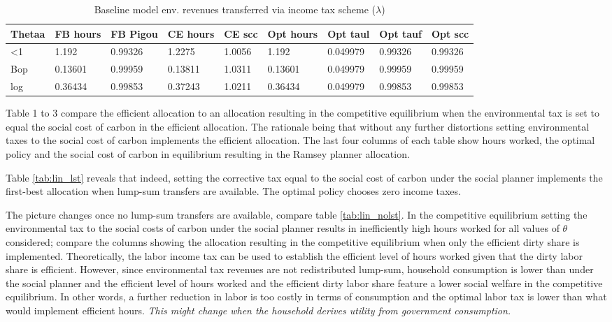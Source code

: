 \begin{table}[h!!]
	\caption{Baseline model env. revenues transferred via income tax scheme ($\lambda$)}\label{tab:base}
	\begin{tabular}{lllllllll}
		Thetaa & FB hours & FB Pigou & CE hours & CE scc & Opt hours & Opt taul & Opt tauf & Opt scc \\ 
		\hline 
		<1 & 1.192 & 0.99326 & 1.2275 & 1.0056 & 1.192 & 0.049979 & 0.99326 & 0.99326 \\ 
		Bop & 0.13601 & 0.99959 & 0.13811 & 1.0311 & 0.13601 & 0.049979 & 0.99959 & 0.99959 \\ 
		log & 0.36434 & 0.99853 & 0.37243 & 1.0211 & 0.36434 & 0.049979 & 0.99853 & 0.99853 \\ 
		\hline 
	\end{tabular}
\end{table}



Table 1 to 3 compare the efficient allocation to an allocation resulting in the competitive equilibrium when the environmental tax is set to equal the social cost of carbon in the efficient allocation. The rationale being that without any further distortions setting environmental taxes to the social cost of carbon implements the efficient allocation. The last four columns of each table show hours worked, the optimal policy and the social cost of carbon in equilibrium resulting in the Ramsey planner allocation. 

Table \ref{tab:lin_lst} reveals that indeed, setting the corrective tax equal to the social cost of carbon under the social planner implements the first-best allocation when lump-sum transfers are available. The optimal policy chooses zero income taxes. 

The picture changes once no lump-sum transfers are available, compare table \ref{tab:lin_nolst}. In the competitive equilibrium setting the environmental tax to the social costs of carbon under the social planner results in inefficiently high hours worked for all values of $\theta$ considered; compare the columns showing the allocation resulting in the competitive equilibrium when only the efficient dirty share is implemented. 
Theoretically, the labor income tax can be used to establish the 
efficient level of hours worked given that the dirty labor share is efficient. However, since
 environmental tax revenues are not redistributed lump-sum, household consumption is lower than under the social planner and the efficient level of hours worked and the efficient dirty labor share feature a lower social welfare in the competitive equilibrium. In other words, a further reduction in labor is too costly in terms of consumption and the optimal labor tax is lower than what would implement efficient hours. \textit{This might change when the household derives utility from government consumption.}

